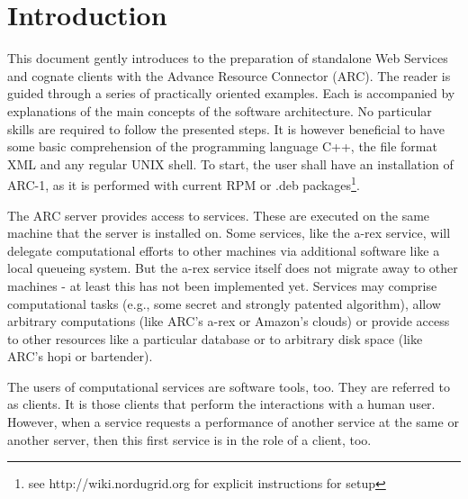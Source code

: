 
\chapter{Introduction}

This document gently introduces to the preparation of standalone Web Services and cognate clients with the Advance Resource Connector (ARC).
The reader is guided through a series of practically oriented examples.
Each is accompanied by explanations of the main concepts of the software architecture.
No particular skills are required to follow the presented steps.
It is however beneficial to have some basic comprehension of the programming language C++, the file format XML and any regular UNIX shell.
To start, the user shall have an installation of ARC-1, as it is performed with current RPM or .deb packages\footnote{see http://wiki.nordugrid.org for explicit instructions for setup}.


The ARC server provides access to services.
These are executed on the same machine that the server is installed on.
Some services, like the a-rex service, will delegate computational efforts to other machines
via additional software like a local queueing system.
But the a-rex service itself does not migrate away to other machines - at least this
has not been implemented yet.
Services may comprise computational tasks (e.g., some secret and strongly
patented algorithm), allow arbitrary computations (like ARC's a-rex or
Amazon's clouds) or provide access to other resources like a particular
database or to arbitrary disk space (like ARC's hopi or bartender).


The users of computational services are software tools, too.
They are referred to as clients.
It is those clients that perform the interactions with a human user.
However, when a service requests a performance of another service at the same or another server, then this first service is in the role of a client, too.


